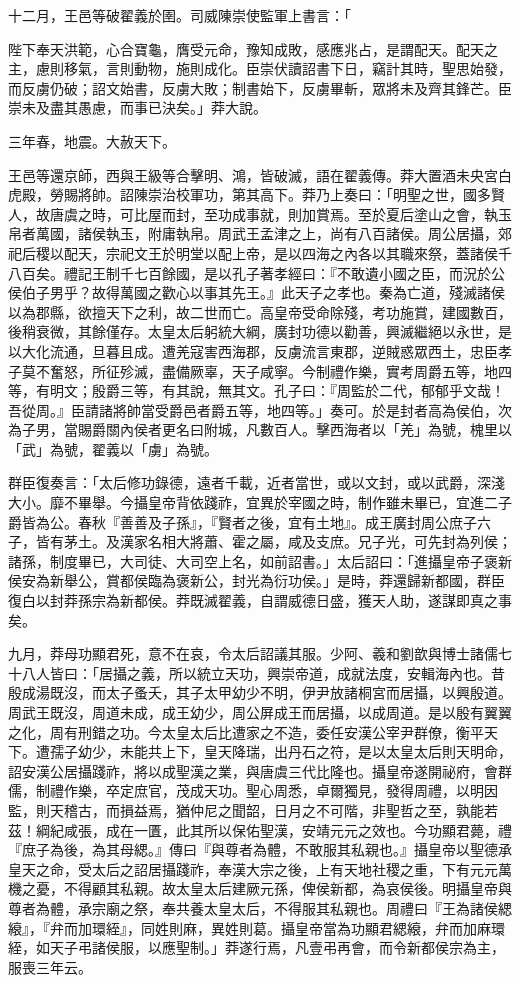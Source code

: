 \begin{pinyinscope}
十二月，王邑等破翟義於圉。司威陳崇使監軍上書言：「

陛下奉天洪範，心合寶龜，膺受元命，豫知成敗，感應兆占，是謂配天。配天之主，慮則移氣，言則動物，施則成化。臣崇伏讀詔書下日，竊計其時，聖思始發，而反虜仍破；詔文始書，反虜大敗；制書始下，反虜畢斬，眾將未及齊其鋒芒。臣崇未及盡其愚慮，而事已決矣。」莽大說。

三年春，地震。大赦天下。

王邑等還京師，西與王級等合擊明、鴻，皆破滅，語在翟義傳。莽大置酒未央宮白虎殿，勞賜將帥。詔陳崇治校軍功，第其高下。莽乃上奏曰：「明聖之世，國多賢人，故唐虞之時，可比屋而封，至功成事就，則加賞焉。至於夏后塗山之會，執玉帛者萬國，諸侯執玉，附庸執帛。周武王孟津之上，尚有八百諸侯。周公居攝，郊祀后稷以配天，宗祀文王於明堂以配上帝，是以四海之內各以其職來祭，蓋諸侯千八百矣。禮記王制千七百餘國，是以孔子著孝經曰：『不敢遺小國之臣，而況於公侯伯子男乎？故得萬國之歡心以事其先王。』此天子之孝也。秦為亡道，殘滅諸侯以為郡縣，欲擅天下之利，故二世而亡。高皇帝受命除殘，考功施賞，建國數百，後稍衰微，其餘僅存。太皇太后躬統大綱，廣封功德以勸善，興滅繼絕以永世，是以大化流通，旦暮且成。遭羌寇害西海郡，反虜流言東郡，逆賊惑眾西土，忠臣孝子莫不奮怒，所征殄滅，盡備厥辜，天子咸寧。今制禮作樂，實考周爵五等，地四等，有明文；殷爵三等，有其說，無其文。孔子曰：『周監於二代，郁郁乎文哉！吾從周。』臣請諸將帥當受爵邑者爵五等，地四等。」奏可。於是封者高為侯伯，次為子男，當賜爵關內侯者更名曰附城，凡數百人。擊西海者以「羌」為號，槐里以「武」為號，翟義以「虜」為號。

群臣復奏言：「太后修功錄德，遠者千載，近者當世，或以文封，或以武爵，深淺大小。靡不畢舉。今攝皇帝背依踐祚，宜異於宰國之時，制作雖未畢已，宜進二子爵皆為公。春秋『善善及子孫』，『賢者之後，宜有土地』。成王廣封周公庶子六子，皆有茅土。及漢家名相大將蕭、霍之屬，咸及支庶。兄子光，可先封為列侯；諸孫，制度畢已，大司徒、大司空上名，如前詔書。」太后詔曰：「進攝皇帝子褒新侯安為新舉公，賞都侯臨為褒新公，封光為衍功侯。」是時，莽還歸新都國，群臣復白以封莽孫宗為新都侯。莽既滅翟義，自謂威德日盛，獲天人助，遂謀即真之事矣。

九月，莽母功顯君死，意不在哀，令太后詔議其服。少阿、羲和劉歆與博士諸儒七十八人皆曰：「居攝之義，所以統立天功，興崇帝道，成就法度，安輯海內也。昔殷成湯既沒，而太子蚤夭，其子太甲幼少不明，伊尹放諸桐宮而居攝，以興殷道。周武王既沒，周道未成，成王幼少，周公屏成王而居攝，以成周道。是以殷有翼翼之化，周有刑錯之功。今太皇太后比遭家之不造，委任安漢公宰尹群僚，衡平天下。遭孺子幼少，未能共上下，皇天降瑞，出丹石之符，是以太皇太后則天明命，詔安漢公居攝踐祚，將以成聖漢之業，與唐虞三代比隆也。攝皇帝遂開祕府，會群儒，制禮作樂，卒定庶官，茂成天功。聖心周悉，卓爾獨見，發得周禮，以明因監，則天稽古，而損益焉，猶仲尼之聞韶，日月之不可階，非聖哲之至，孰能若茲！綱紀咸張，成在一匱，此其所以保佑聖漢，安靖元元之效也。今功顯君薨，禮『庶子為後，為其母緦。』傳曰『與尊者為體，不敢服其私親也。』攝皇帝以聖德承皇天之命，受太后之詔居攝踐祚，奉漢大宗之後，上有天地社稷之重，下有元元萬機之憂，不得顧其私親。故太皇太后建厥元孫，俾侯新都，為哀侯後。明攝皇帝與尊者為體，承宗廟之祭，奉共養太皇太后，不得服其私親也。周禮曰『王為諸侯緦縗』，『弁而加環絰』，同姓則麻，異姓則葛。攝皇帝當為功顯君緦縗，弁而加麻環絰，如天子弔諸侯服，以應聖制。」莽遂行焉，凡壹弔再會，而令新都侯宗為主，服喪三年云。


\end{pinyinscope}
